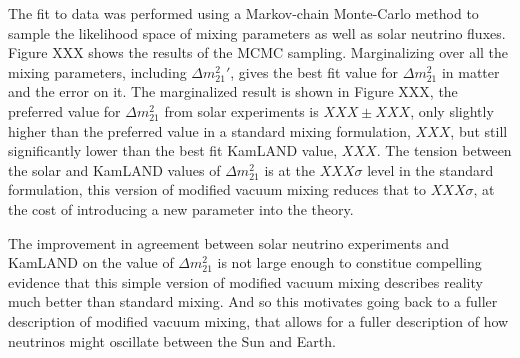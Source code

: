 The fit to data was performed using a Markov-chain Monte-Carlo method to sample
the likelihood space of mixing parameters as well as solar neutrino fluxes.
Figure XXX shows the results of the MCMC sampling. Marginalizing over all
the mixing parameters, including $\Delta m^{2}_{21}\prime$, gives the best fit
value for $\Delta m^{2}_{21}$ in matter and the error on it.
The marginalized result is shown in Figure XXX, the preferred value
for $\Delta m^{2}_{21}$ from solar experiments is $XXX\pm XXX$, only slightly higher than
the preferred value in a standard mixing formulation, $XXX$, but still significantly
lower than the best fit KamLAND value, $XXX$.
The tension between the solar and KamLAND values of $\Delta m^{2}_{21}$ is at
the $XXX\sigma$ level in the standard formulation, this version of modified
vacuum mixing reduces that to $XXX\sigma$, at the cost of introducing a new
parameter into the theory.

The improvement in agreement between solar neutrino experiments and KamLAND on
the value of $\Delta m^{2}_{21}$ is not large enough to constitue compelling evidence
that this simple version of modified vacuum mixing describes reality much better
than standard mixing. And so this motivates going back to a fuller description
of modified vacuum mixing, that allows for a fuller description of how
neutrinos might oscillate between the Sun and Earth.
